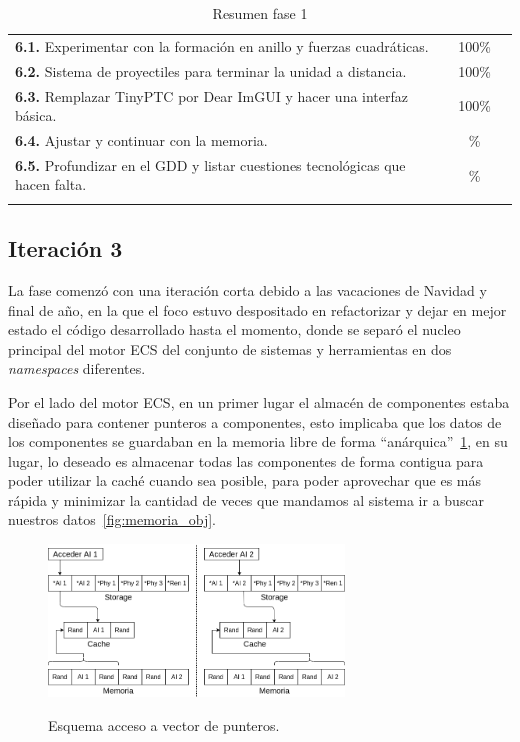 \begin{longtable}[c]{|p{7cm}|c|c|}
	\cmidrule[1pt]{1-3}

\textbf{6.1.} Experimentar con la formación en anillo
				y fuerzas cuadráticas.                     & 100\% &   \\
	\cmidrule[.003pt]{1-3}
\textbf{6.2.} Sistema de proyectiles para terminar la
				unidad a distancia.                        & 100\% &   \\
	\cmidrule[.003pt]{1-3}
\textbf{6.3.} Remplazar  TinyPTC por Dear ImGUI y
				hacer una interfaz básica.                 & 100\% &   \\
	\cmidrule[.003pt]{1-3}
\textbf{6.4.} Ajustar y continuar con la memoria.          & \% &   \\
	\cmidrule[.003pt]{1-3}
\textbf{6.5.} Profundizar en el GDD y listar cuestiones
				tecnológicas que hacen falta.              & \% &   \\
\hline
\caption{Resumen fase 1}
\end{longtable}

\subsection*{Iteración 3}
La fase comenzó con una iteración corta debido a las vacaciones de Navidad y final de año, en la
que el foco estuvo despositado en refactorizar y dejar en mejor estado el código desarrollado
hasta el momento, donde se separó el nucleo principal del motor \ac{ECS} del conjunto de sistemas y
herramientas en dos \textit{namespaces} diferentes. 

Por el lado del motor \ac{ECS}, en un primer lugar el almacén de componentes estaba diseñado
para contener punteros a componentes, esto implicaba que los datos de los componentes se
guardaban en la memoria libre de forma ``anárquica''~\ref{fig:memoria_ptr}, 
en su lugar, lo deseado es almacenar todas las componentes de forma contigua para poder utilizar
la caché cuando sea posible, para poder aprovechar que es más rápida y minimizar la cantidad de
veces que mandamos al sistema ir a buscar nuestros datos~\ref{fig:memoria_obj}.

\begin{figure}[htb]
\centering
\includegraphics[width=0.7\textwidth]{imagenes/diario_desarrollo/memoria2.png}\\
\caption{Esquema acceso a vector de punteros.}
\label{fig:memoria_ptr}
\end{figure}


